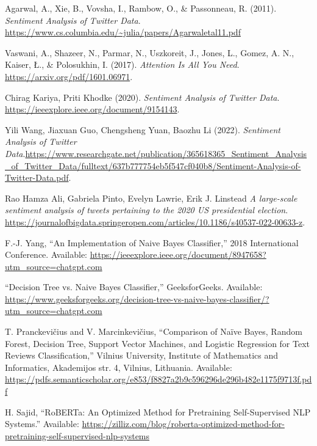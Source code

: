\documentclass[journal]{IEEEtran}
\begin{document}
\begin{thebibliography}{99}
     Agarwal, A., Xie, B., Vovsha, I., Rambow, O., \& Passonneau, R. (2011). \textit{Sentiment Analysis of Twitter Data}.  \url{https://www.cs.columbia.edu/~julia/papers/Agarwaletal11.pdf}

     Vaswani, A., Shazeer, N., Parmar, N., Uszkoreit, J., Jones, L., Gomez, A. N., Kaiser, Ł., \& Polosukhin, I. (2017). \textit{Attention Is All You Need}. \url{https://arxiv.org/pdf/1601.06971}.

     Chirag Kariya, Priti Khodke (2020). \textit{Sentiment Analysis of Twitter Data}.  \url{https://ieeexplore.ieee.org/document/9154143}.

    Yili Wang, Jiaxuan Guo, Chengsheng Yuan, Baozhu Li
 (2022). \textit{Sentiment Analysis of Twitter Data}.\url{https://www.researchgate.net/publication/365618365_Sentiment_Analysis_of_Twitter_Data/fulltext/637b777754eb5f547cf040b8/Sentiment-Analysis-of-Twitter-Data.pdf}.

     Rao Hamza Ali, Gabriela Pinto, Evelyn Lawrie, Erik J. Linstead \textit{A large-scale sentiment analysis of tweets pertaining to the 2020 US presidential election}. \url{https://journalofbigdata.springeropen.com/articles/10.1186/s40537-022-00633-z}.
    
     F.-J. Yang, ``An Implementation of Naive Bayes Classifier,'' 2018 International Conference. Available: \url{https://ieeexplore.ieee.org/document/8947658?utm_source=chatgpt.com}
    
     ``Decision Tree vs. Naive Bayes Classifier,'' GeeksforGeeks. Available: \url{https://www.geeksforgeeks.org/decision-tree-vs-naive-bayes-classifier/?utm_source=chatgpt.com}
    
     T. Pranckevičius and V. Marcinkevičius, ``Comparison of Naïve Bayes, Random Forest, Decision Tree, Support Vector Machines, and Logistic Regression for Text Reviews Classification,'' Vilnius University, Institute of Mathematics and Informatics, Akademijos str. 4, Vilnius, Lithuania. Available: \url{https://pdfs.semanticscholar.org/e853/f8827a2b9c596296de296b482e1175f9713f.pdf}
    
     H. Sajid, ``RoBERTa: An Optimized Method for Pretraining Self-Supervised NLP Systems.'' Available: \url{https://zilliz.com/blog/roberta-optimized-method-for-pretraining-self-supervised-nlp-systems}
    

\end{thebibliography}
\end{document}
